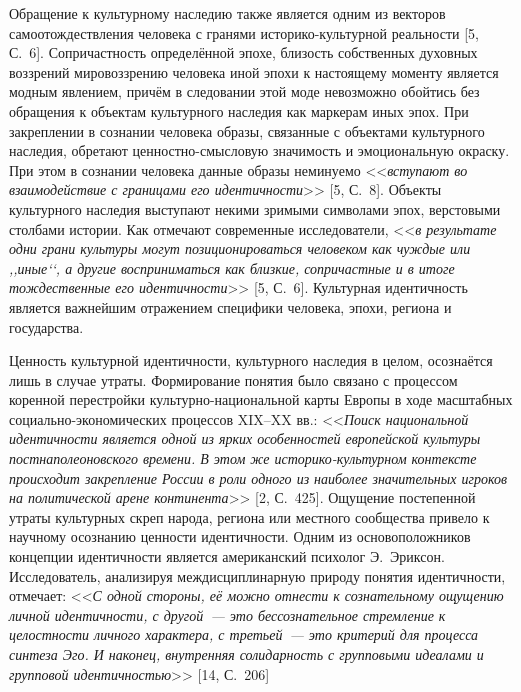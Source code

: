  

\makeProcTitle
{}

Обращение к культурному наследию также является одним из векторов самоотождествления человека с гранями историко-культурной реальности [5, С.~6]. Сопричастность определённой эпохе, близость собственных духовных воззрений мировоззрению человека иной эпохи к настоящему моменту является модным явлением, причём в следовании этой моде невозможно обойтись без обращения к объектам культурного наследия как маркерам иных эпох. При закреплении в сознании человека образы, связанные с объектами культурного наследия, обретают ценностно-смысловую значимость и эмоциональную окраску. При этом в сознании человека данные образы неминуемо <<\textit{вступают во взаимодействие с границами его идентичности}>> [5, С.~8]. Объекты культурного наследия выступают некими зримыми символами эпох, верстовыми столбами истории. Как отмечают современные исследователи, <<\textit{в результате одни грани культуры могут позиционироваться человеком как чуждые или ,,иные‘‘, а другие восприниматься как близкие, сопричастные и в итоге тождественные его идентичности}>> [5, С.~6]. Культурная идентичность является важнейшим отражением специфики человека, эпохи, региона и государства.

Ценность культурной идентичности, культурного наследия в целом, осознаётся лишь в случае утраты. Формирование понятия было связано с процессом коренной перестройки культурно-национальной карты Европы в ходе масштабных социально-экономических процессов XIX--XX вв.: <<\textit{Поиск национальной идентичности является одной из ярких особенностей европейской культуры постнаполеоновского времени. В этом же историко-культурном контексте происходит закрепление России в роли одного из наиболее значительных игроков на политической арене континента}>> [2, С.~425]. Ощущение постепенной утраты культурных скреп народа, региона или местного сообщества привело к научному осознанию ценности идентичности. Одним из основоположников концепции идентичности является американский психолог Э.~Эриксон. Исследователь, анализируя междисциплинарную природу понятия идентичности, отмечает: <<\textit{С одной стороны, её можно отнести к сознательному ощущению личной идентичности, с другой~--- это бессознательное стремление к целостности личного характера, с третьей~--- это критерий для процесса синтеза Эго. И наконец, внутренняя солидарность с групповыми идеалами и групповой идентичностью}>> [14, С.~206]

